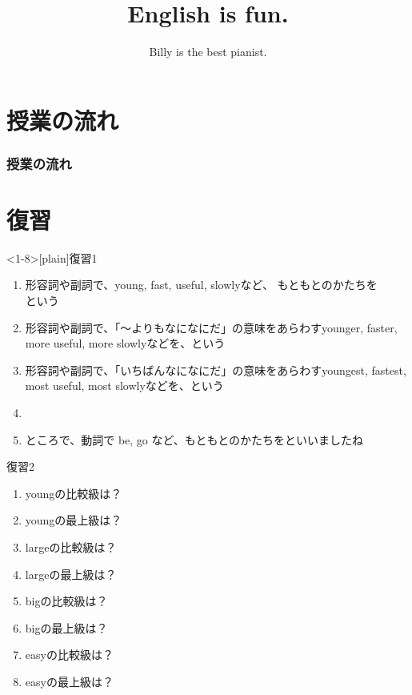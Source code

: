 \documentclass[aspectratio=169,xcolor={dvipsnames,table}]{beamer}
\title{English is fun.}
\subtitle{Billy is the best pianist.}
\author{}
\institute[]{}
\date[]
\begin{document}
\begin{frame}[plain]
  \titlepage
\end{frame}

\section*{授業の流れ}
\begin{frame}[plain]
  \frametitle{授業の流れ}
  \tableofcontents
\end{frame}
\section{復習}
\begin{frame}<1-8>[plain]{復習1}
 
\begin{enumerate}
 \item<2-> 形容詞や副詞で、young, fast, useful, slowlyなど、
もともとのかたちを\\という
 \item<4-> 形容詞や副詞で、「～よりもなになにだ」の意味をあらわすyounger,  faster, more useful, more slowlyなどを、という
 \item<6-> 形容詞や副詞で、「いちばんなになにだ」の意味をあらわすyoungest, fastest,  most useful, most slowlyなどを、という
 \item[] \item<8->[] ところで、動詞で be, go など、もともとのかたちをといいましたね
\end{enumerate}
\end{frame}
\begin{frame}[plain]{復習2}
 
\begin{enumerate}
 \item youngの比較級は？\hfill{}
 \item youngの最上級は？\hfill{}
 \item largeの比較級は？\hfill{}
 \item largeの最上級は？\hfill{}
 \item bigの比較級は？\hfill{}
 \item bigの最上級は？\hfill{}
 \item easyの比較級は？\hfill{}
 \item easyの最上級は？\hfill{}

\end{enumerate}
\end{frame}
\end{document}
